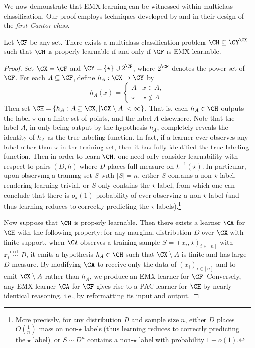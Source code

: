 \documentclass[11pt]{article}
\begin{document}
We now demonstrate that EMX learning can be witnessed within multiclass classification. Our proof employs techniques developed by 
\cite{daniely2015multiclass} and \cite{DS14} in their design of the \emph{first Cantor class}. 

\begin{proposition}\label{Proposition:EMX-is-really-multiclass}
Let $\CF$ be any set. There exists a multiclass classification problem $\CH \subseteq \CY^\CX$ such that $\CH$ is properly learnable if and only if $\CF$ is EMX-learnable. 
\end{proposition}
\begin{proof}
Set $\CX = \CF$ and $\CY = \{\star\} \cup 2^{\CF}$, where $2^{\CF}$ denotes the power set of $\CF$. For each $A \subseteq \CF$, define $h_A: \CX \to \CY$ by 
\[ h_A(x) = \begin{cases} A & x \in A, \\ \star & x \notin A. \end{cases} \]
Then set $\CH = \{h_A : A \subseteq \CX, |\CX \setminus A| < \infty\}$. That is, each $h_A \in \CH$ outputs the label $\star$ on a finite set of points, and the label $A$ elsewhere. Note that the label $A$, in only being output by the hypothesis $h_A$, completely reveals the identity of $h_A$ as the true labeling function. In fact, if a learner  ever observes any label other than $\star$ in the training set, then it has fully identified the true labeling function. Then in order to learn $\CH$, one need only consider learnability with respect to pairs $(D, h)$ where $D$ places full measure on $h^{-1}(\star)$. In particular, upon observing a training set $S$ with $|S| = n$, either $S$ contains a non-$\star$ label, rendering learning trivial, or $S$ only contains the $\star$ label, from which one can conclude that there is $o_n(1)$ probability of ever observing a non-$\star$ label (and thus learning reduces to correctly predicting the $\star$ labels).\footnote{More precisely, for any distribution $D$ and sample size $n$, either $D$ places $O(\frac{1}{n})$ mass on non-$\star$ labels (thus learning reduces to correctly predicting the $\star$ label), or $S \sim D^n$ contains a non-$\star$ label with probability $1 - o(1)$.}

Now suppose that $\CH$ is properly learnable. Then there exists a learner $\CA$ for $\CH$ with the following property: for any marginal distribution $D$ over $\CX$ with finite support, when $\CA$ observes a training sample $S = (x_i, \star)_{i \in [n]}$ with $x_{i} \overset{\text{i.i.d.\ }}{\sim} D$, it emits a hypothesis $h_A \in \CH$ such that $\CX \setminus A$ is finite and has large $D$-measure. By modifying $\CA$ to receive only the data of $(x_i)_{i \in [n]}$ and to emit $\CX \setminus A$ rather than $h_A$, we produce an EMX learner for $\CF$. Conversely, any EMX learner $\CA$ for $\CF$ gives rise to a PAC learner for $\CH$ by nearly identical reasoning, i.e., by reformatting its input and output. 
\end{proof}
\end{document}
